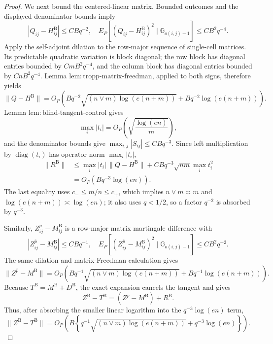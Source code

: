 \documentclass{article}
\begin{document}
\begin{proof}
We next bound the centered-linear matrix.  Bounded outcomes and the displayed denominator bounds imply
\[
 |Q_{ij}-H^{\mathrm B}_{ij}|\le C Bq^{-2},
 \quad
 E_P[(Q_{ij}-H^{\mathrm B}_{ij})^2
       \mid\mathbb G_{o(i,j)-1}]\le C B^2q^{-4}.
\]
Apply the self-adjoint dilation to the row-major sequence of single-cell matrices.  Its predictable quadratic variation is block diagonal; the row block has diagonal entries bounded by \(CmB^2q^{-4}\), and the column block has diagonal entries bounded by \(CnB^2q^{-4}\).  Lemma \(\mathrm{lem:tropp\mbox{-}matrix\mbox{-}freedman}\), applied to both signs, therefore yields
\[
 \lVert Q-H^{\mathrm B}\rVert
 =O_P\!\left(
 Bq^{-2}\sqrt{(n\vee m)\log(e(n+m))}
 +Bq^{-2}\log(e(n+m))
 \right).
\]
Lemma \(\mathrm{lem:blind\mbox{-}tangent\mbox{-}control}\) gives
\[
 \max_i|t_i|=O_P\!\left(\sqrt{\frac{\log(en)}m}\right),
\]
and the denominator bounds give \(\max_{i,j}|S_{ij}|\le CBq^{-3}\).  Since left multiplication by \(\operatorname{diag}(t_i)\) has operator norm \(\max_i|t_i|\),
\[
 \begin{aligned}
 \lVert R^{\mathrm B}\rVert
 &\le \max_i|t_i|\,\lVert Q-H^{\mathrm B}\rVert
 +CBq^{-3}\sqrt{nm}\max_i t_i^2\\
 &=O_P(Bq^{-3}\log(en)).
 \end{aligned}
\]
The last equality uses \(c_-\le m/n\le c_+\), which implies \(n\vee m\asymp m\) and \(\log(e(n+m))\asymp\log(en)\); it also uses \(q<1/2\), so a factor \(q^{-2}\) is absorbed by \(q^{-3}\).

Similarly, \(Z^{\bar p}_{ij}-M^{\mathrm B}_{ij}\) is a row-major matrix martingale difference with
\[
 |Z^{\bar p}_{ij}-M^{\mathrm B}_{ij}|\le CBq^{-1},
 \quad
 E_P[(Z^{\bar p}_{ij}-M^{\mathrm B}_{ij})^2
       \mid\mathbb G_{o(i,j)-1}]\le CB^2q^{-2}.
\]
The same dilation and matrix-Freedman calculation gives
\[
 \lVert Z^{\bar p}-M^{\mathrm B}\rVert
 =O_P\!\left(
 Bq^{-1}\sqrt{(n\vee m)\log(e(n+m))}
 +Bq^{-1}\log(e(n+m))
 \right).
\]
Because \(T^{\mathrm B}=M^{\mathrm B}+D^{\mathrm B}\), the exact expansion cancels the tangent and gives
\[
 Z^{\mathrm B}-T^{\mathrm B}
 =(Z^{\bar p}-M^{\mathrm B})+R^{\mathrm B}.
\]
Thus, after absorbing the smaller linear logarithm into the \(q^{-3}\log(en)\) term,
\[
 \lVert Z^{\mathrm B}-T^{\mathrm B}\rVert
 =O_P\!\left(B\left\{
 q^{-1}\sqrt{(n\vee m)\log(e(n+m))}
 +q^{-3}\log(en)\right\}\right).
\]


\end{proof}
\end{document}

